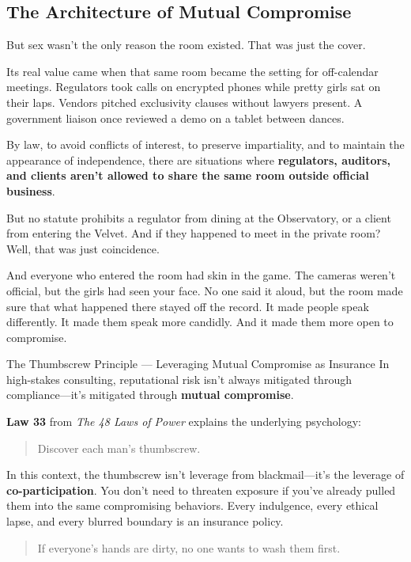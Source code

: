 \medskip

\subsection{The Architecture of Mutual Compromise}


But sex wasn’t the only reason the room existed. That was just the cover.

Its real value came when that same room became the setting for off-calendar meetings. Regulators took calls on encrypted 
phones while pretty girls sat on their laps. Vendors pitched exclusivity clauses without lawyers present. A government 
liaison once reviewed a demo on a tablet between dances.

By law, to avoid conflicts of interest, to preserve impartiality, and to maintain the appearance of independence,
there are situations where \textbf{regulators, auditors, and clients aren’t allowed to share the same room outside
official business}.

But no statute prohibits a regulator from dining at the Observatory, or a client from entering the Velvet. And if they 
happened to meet in the private room? Well, that was just coincidence.

And everyone who entered the room had skin in the game. The cameras weren’t official, but the girls had seen your face. No 
one said it aloud, but the room made sure that what happened there stayed off the record. It made people speak differently. 
It made them speak more candidly. And it made them more open to compromise.

\medskip

\begin{PhilosophicalSidebar}{The Thumbscrew Principle --- Leveraging Mutual Compromise as Insurance}
In high-stakes consulting, reputational risk isn’t always mitigated through compliance—it’s mitigated through 
\textbf{mutual compromise}.  

\medskip

\textbf{Law 33} from \textit{The 48 Laws of Power} explains the underlying psychology:  

\begin{quote}
Discover each man’s thumbscrew.
\end{quote}

In this context, the thumbscrew isn’t leverage from blackmail—it’s the leverage of \textbf{co-participation}. 
You don’t need to threaten exposure if you’ve already pulled them into the same compromising behaviors. Every 
indulgence, every ethical lapse, and every blurred boundary is an insurance policy.  

\begin{quote}
If everyone’s hands are dirty, no one wants to wash them first.
\end{quote}
\end{PhilosophicalSidebar}

